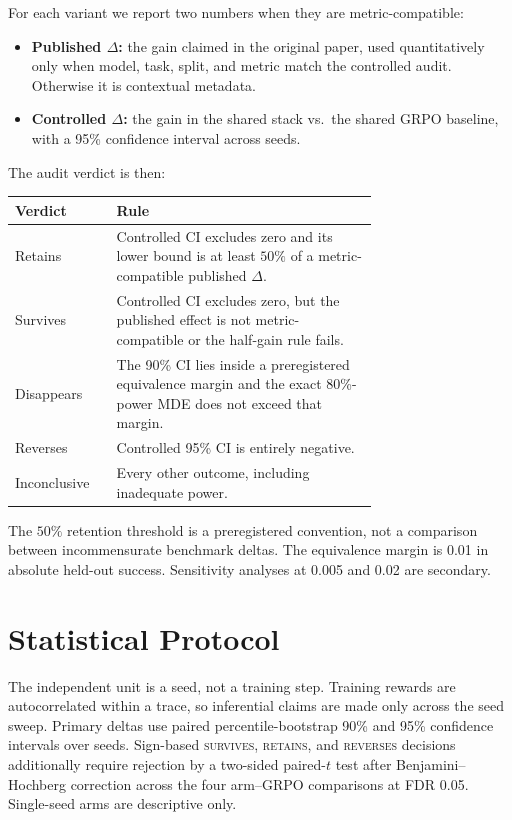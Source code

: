 \documentclass[11pt]{article}
\begin{document}
For each variant we report two numbers when they are metric-compatible:
\begin{itemize}[leftmargin=1.4em, itemsep=2pt]
  \item \textbf{Published $\Delta$:} the gain claimed in the original paper,
    used quantitatively only when model, task, split, and metric match the
    controlled audit. Otherwise it is contextual metadata.
  \item \textbf{Controlled $\Delta$:} the gain in the shared stack vs.\ the
    shared GRPO baseline, with a 95\% confidence interval across seeds.
\end{itemize}
The audit verdict is then:
\begin{center}
\small
\begin{tabular}{@{}lp{0.72\linewidth}@{}}
\toprule
\textbf{Verdict} & \textbf{Rule}\\
\midrule
Retains & Controlled CI excludes zero and its lower bound is at least $50\%$
  of a metric-compatible published $\Delta$.\\
Survives & Controlled CI excludes zero, but the published effect is not
  metric-compatible or the half-gain rule fails.\\
Disappears & The 90\% CI lies inside a preregistered equivalence margin and the
  exact 80\%-power MDE does not exceed that margin.\\
Reverses & Controlled 95\% CI is entirely negative.\\
Inconclusive & Every other outcome, including inadequate power.\\
\bottomrule
\end{tabular}
\end{center}
The $50\%$ retention threshold is a preregistered convention, not a comparison
between incommensurate benchmark deltas. The equivalence margin is 0.01 in
absolute held-out success. Sensitivity analyses at 0.005 and 0.02 are secondary.

\section{Statistical Protocol}
\label{sec:stats}


The independent unit is a seed, not a training step. Training rewards are
autocorrelated within a trace, so inferential claims are made only across the
seed sweep. Primary deltas use paired percentile-bootstrap 90\% and 95\%
confidence intervals over seeds. Sign-based \textsc{survives}, \textsc{retains},
and \textsc{reverses} decisions additionally require rejection by a two-sided
paired-$t$ test after Benjamini--Hochberg correction across the four arm--GRPO
comparisons at FDR 0.05. Single-seed arms are descriptive only.
\end{document}
